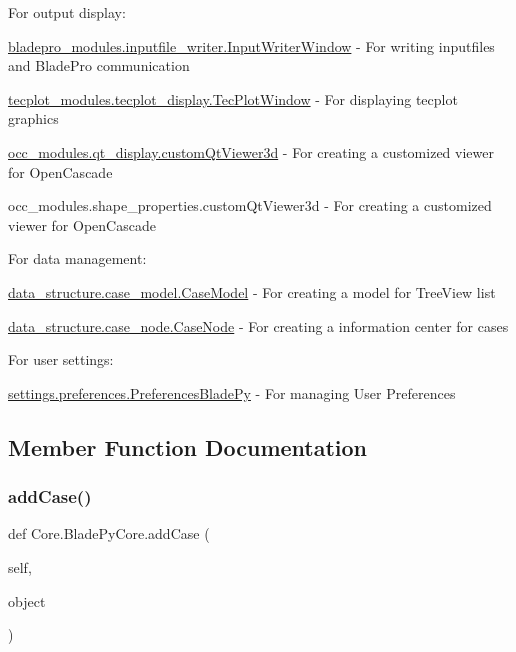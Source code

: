 For output display\+: \begin{DoxyItemize}
\item {\ttfamily \hyperlink{a00073}{bladepro\+\_\+modules.\+inputfile\+\_\+writer.\+Input\+Writer\+Window}} -\/ For writing inputfiles and Blade\+Pro communication \item {\ttfamily \hyperlink{a00117}{tecplot\+\_\+modules.\+tecplot\+\_\+display.\+Tec\+Plot\+Window}} -\/ For displaying tecplot graphics \item {\ttfamily \hyperlink{a00093}{occ\+\_\+modules.\+qt\+\_\+display.\+custom\+Qt\+Viewer3d}} -\/ For creating a customized viewer for Open\+Cascade \item {\ttfamily occ\+\_\+modules.\+shape\+\_\+properties.\+custom\+Qt\+Viewer3d} -\/ For creating a customized viewer for Open\+Cascade\end{DoxyItemize}
For data management\+: \begin{DoxyItemize}
\item {\ttfamily \hyperlink{a00085}{data\+\_\+structure.\+case\+\_\+model.\+Case\+Model}} -\/ For creating a model for Tree\+View list \item {\ttfamily \hyperlink{a00089}{data\+\_\+structure.\+case\+\_\+node.\+Case\+Node}} -\/ For creating a information center for cases\end{DoxyItemize}
For user settings\+: \begin{DoxyItemize}
\item {\ttfamily \hyperlink{a00109}{settings.\+preferences.\+Preferences\+Blade\+Py}} -\/ For managing User Preferences \end{DoxyItemize}


\subsection{Member Function Documentation}
\hypertarget{a00081_a1a62f9b5b8f5929bdb6f0a8c27049d9e}{}\label{a00081_a1a62f9b5b8f5929bdb6f0a8c27049d9e} 
\subsubsection{\texorpdfstring{add\+Case()}{addCase()}}
{\footnotesize\ttfamily def Core.\+Blade\+Py\+Core.\+add\+Case (\begin{DoxyParamCaption}\item[{}]{self,  }\item[{}]{object }\end{DoxyParamCaption})}



